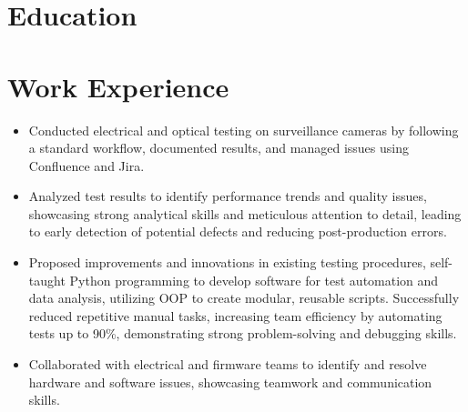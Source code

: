 \documentclass[11pt,a4paper,sans]{moderncv}
\begin{document}
\makecvtitle
\vspace{-1.5cm} 

\section{Education}

\vspace{-0.5cm} 

\section{Work Experience}
{
    \begin{itemize}
    \item Conducted electrical and optical testing on surveillance cameras by following a standard workflow, documented results, and managed issues using Confluence and Jira.
    \item Analyzed test results to identify performance trends and quality issues, showcasing strong analytical skills and meticulous attention to detail, leading to early detection of potential defects and reducing post-production errors.
    \item Proposed improvements and innovations in existing testing procedures, self-taught Python programming to develop software for test automation and data analysis, utilizing OOP to create modular, reusable scripts. Successfully reduced repetitive manual tasks, increasing team efficiency by automating tests up to 90\%, demonstrating strong problem-solving and debugging skills.
    \item Collaborated with electrical and firmware teams to identify and resolve hardware and software issues, showcasing teamwork and communication skills.
    \end{itemize}
}
\end{document}
